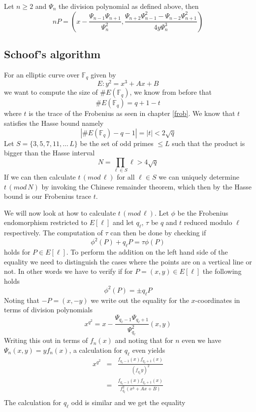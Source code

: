 \begin{prop}
 Let $n \geq 2$ and $\Psi_n$ the division polynomial as defined above, then
$$ nP = (x - \frac{\Psi_{n-1} \Psi_{n+1}}{\Psi_n^2}, \frac{\Psi_{n+2} \Psi_{n-1}^2 - \Psi_{n-2} \Psi_{n+1}^2}{4y \Psi_n^3} )$$
\end{prop}

\subsection{Schoof's algorithm}
For an elliptic curve over $\mathbb{F}_q$ given by
$$ E: y^2 = x^3 + Ax + B $$
we want to compute the size of $\#E(\mathbb{F}_q)$, we know from before that
$$ \#E(\mathbb{F}_q) = q + 1 - t $$
where $t$ is the trace of the Frobenius as seen in chapter \ref{frob}. We know
that $t$ satisfies the Hasse bound namely
$$ |\#E(\mathbb{F}_q)-q-1|=|t| < 2\sqrt{q} $$
Let $S = \{3, 5, 7, 11, \ldots \, L \}$ be the set of odd primes $\leq L$ such
that the product is bigger than the Hasse interval
$$ N = \prod_{\ell \in S} \ell  > 4\sqrt{q} $$
If we can then calculate $t\, (mod\,\ell)$ for all $\ell \in S$ we can uniquely
determine $t\,(mod\,N)$ by invoking the Chinese remainder theorem,
which then by the Hasse bound is our Frobenius trace $t$.

We will now look at
how to calculate $t\, (mod\,\ell)$. Let $\phi$ be the Frobenius endomorphism
restricted to $E[\ell]$ and let $q_\ell$, $\tau$ be $q$ and $t$ reduced modulo $\ell$
respectively. The computation of $\tau$ can then be done by checking if
$$ \phi^2(P) + q_\ell P = \tau \phi(P) $$
holds for $P \in E[\ell]$. To perform the addition on the left hand side of the
equality we need to distinguish the cases where the points are on a vertical line or not.
In other words we have to verify if for $P = (x,y) \in E[\ell]$ the following holds
$$ \phi^2 (P) = \pm q_\ell P $$
Noting that $-P = (x, -y)$ we write out the equality for the $x$-coordinates in terms of
division polynomials
$$ x^{q^2} = x - \frac{\Psi_{q_\ell-1} \Psi_{q_\ell+1}}{\Psi_{q_\ell}^2}(x,y) $$
Writing this out in terms of $f_n(x)$ and noting that for $n$ even we have
$\Psi_n(x,y) = y f_n(x)$, a calculation for $q_\ell$ even yields
\begin{eqnarray*}
 x^{q^2} &=& \frac{f_{q_\ell-1}(x) f_{q_\ell+1}(x)}{(f_{q_\ell} y)^2} \nonumber \\
	 &=& \frac{f_{q_\ell-1}(x) f_{q_\ell+1}(x)}{f_{q_\ell}^2 (x^3+Ax+B)} \nonumber \\
\end{eqnarray*}
The calculation for $q_\ell$ odd is similar and we get the equality

